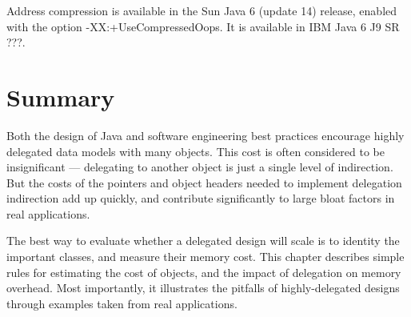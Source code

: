 Address compression is available in the Sun Java 6 (update 14) release, enabled with the option -XX:+UseCompressedOops. It is available in IBM Java 6 J9 SR ???.

\section{Summary}


Both the design of Java and software engineering best practices encourage highly delegated data models with many objects. This cost is often considered to be insignificant --- delegating to another object is just a single level of indirection. But the costs of the pointers and object headers needed to implement delegation indirection add up quickly, and contribute significantly to large bloat factors in real applications. 

The best way to evaluate whether a delegated design will scale is to identity the important classes, and measure their memory cost. This chapter describes simple rules for estimating the cost of objects, and the impact of delegation on memory overhead. Most importantly, it illustrates  the pitfalls of highly-delegated designs through examples taken from real applications.  
